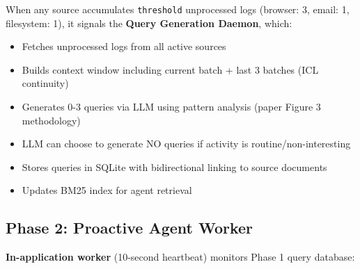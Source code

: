 \documentclass[11pt,a4paper]{article}
\begin{document}
When any source accumulates \texttt{threshold} unprocessed logs (browser: 3, email: 1, filesystem: 1), it signals the \textbf{Query Generation Daemon}, which:
\begin{itemize}
    \item Fetches unprocessed logs from all active sources
    \item Builds context window including current batch + last 3 batches (ICL continuity)
    \item Generates 0-3 queries via LLM using pattern analysis (paper Figure 3 methodology)
    \item LLM can choose to generate NO queries if activity is routine/non-interesting
    \item Stores queries in SQLite with bidirectional linking to source documents
    \item Updates BM25 index for agent retrieval
\end{itemize}

\subsection{Phase 2: Proactive Agent Worker}
\textbf{In-application worker} (10-second heartbeat) monitors Phase 1 query database:
\end{document}
